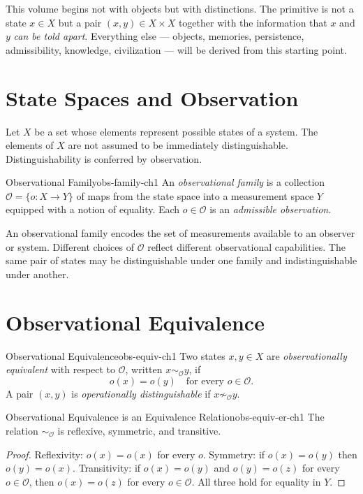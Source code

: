 \documentclass[12pt,twoside,openright]{book}
\newcommand{\obs}{\mathcal{O}}
\begin{document}
This volume begins not with objects but with distinctions. The
primitive is not a state $x\in X$ but a pair $(x,y)\in X\times X$
together with the information that $x$ and $y$ \emph{can be
told apart}. Everything else — objects, memories, persistence,
admissibility, knowledge, civilization — will be derived from
this starting point.

\section{State Spaces and Observation}

Let $X$ be a set whose elements represent possible states of a
system. The elements of $X$ are not assumed to be immediately
distinguishable. Distinguishability is conferred by observation.

\begin{definition}{Observational Family}{obs-family-ch1}
An \emph{observational family} is a collection
$\obs=\{o:X\to Y\}$ of maps from the state space into a
measurement space $Y$ equipped with a notion of equality.
Each $o\in\obs$ is an \emph{admissible observation}.
\end{definition}

An observational family encodes the set of measurements
available to an observer or system. Different choices of $\obs$
reflect different observational capabilities. The same pair of
states may be distinguishable under one family and
indistinguishable under another.

\section{Observational Equivalence}

\begin{definition}{Observational Equivalence}{obs-equiv-ch1}
Two states $x,y\in X$ are \emph{observationally equivalent}
with respect to $\obs$, written $x\sim_\obs y$, if
\[
  o(x) = o(y) \quad\text{for every }o\in\obs.
\]
A pair $(x,y)$ is \emph{operationally distinguishable} if
$x\not\sim_\obs y$.
\end{definition}

\begin{proposition}{Observational Equivalence is an Equivalence
  Relation}{obs-equiv-er-ch1}
The relation $\sim_\obs$ is reflexive, symmetric, and transitive.
\begin{proof}
Reflexivity: $o(x)=o(x)$ for every $o$.
Symmetry: if $o(x)=o(y)$ then $o(y)=o(x)$.
Transitivity: if $o(x)=o(y)$ and $o(y)=o(z)$ for every
$o\in\obs$, then $o(x)=o(z)$ for every $o\in\obs$.
All three hold for equality in $Y$.
\end{proof}
\end{proposition}
\end{document}
